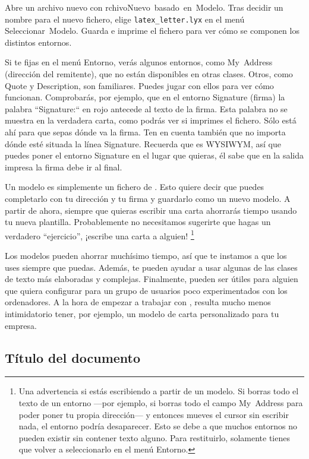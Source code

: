 Abre un archivo nuevo con \textsf{}\textsf{rchivo\lyxarrow{}Nuevo~basado~en~Modelo}.
Tras decidir un nombre para el nuevo fichero, elige \texttt{latex\_letter.lyx}
en el menú \textsf{Seleccionar~Modelo}. Guarda e imprime el fichero
para ver cómo se componen los distintos entornos.

Si te fijas en el menú \textsf{Entorno}, verás algunos entornos, como
\textsf{My~Address} (dirección del remitente), que no están disponibles
en otras clases. Otros, como \textsf{Quote} y \textsf{Description},
son familiares. Puedes jugar con ellos para ver cómo funcionan. Comprobarás,
por ejemplo, que en el entorno \textsf{Signature} (firma) la palabra
{}``Signature:{}`` en rojo antecede al texto de la firma. Esta palabra
no se muestra en la verdadera carta, como podrás ver si imprimes el
fichero. Sólo está ahí para que sepas dónde va la firma. Ten en cuenta
también que no importa dónde esté situada la línea \textsf{Signature}.
Recuerda que \LyX{} es WYSIWYM, así que puedes poner el entorno \textsf{Signature}
en el lugar que quieras, él sabe que en la salida impresa la firma
debe ir al final.

Un modelo es simplemente un fichero de \LyX{}. Esto quiere decir que
puedes completarlo con tu dirección y tu firma y guardarlo como un
nuevo modelo. A partir de ahora, siempre que quieras escribir una
carta ahorrarás tiempo usando tu nueva plantilla. Probablemente no
necesitamos sugerirte que hagas un verdadero {}``ejercicio'', ¡escribe
una carta a alguien!%
\footnote{Una advertencia si estás escribiendo a partir de un modelo. Si borras
todo el texto de un entorno ---por ejemplo, si borras todo el campo
\textsf{My~Address} para poder poner tu propia dirección--- y entonces
mueves el cursor sin escribir nada, el entorno podría desaparecer.
Esto se debe a que muchos entornos no pueden existir sin contener
texto alguno. Para restituirlo, solamente tienes que volver a seleccionarlo
en el menú \textsf{Entorno}.%
}

Los modelos pueden ahorrar muchísimo tiempo, así que te instamos a
que los uses siempre que puedas. Además, te pueden ayudar a usar algunas
de las clases de texto más elaboradas y complejas. Finalmente, pueden
ser útiles para alguien que quiera configurar \LyX{} para un grupo
de usuarios poco experimentados con los ordenadores. A la hora de
empezar a trabajar con \LyX{}, resulta mucho menos intimidatorio tener,
por ejemplo, un modelo de carta personalizado para tu empresa.


\subsection{Título del documento}

